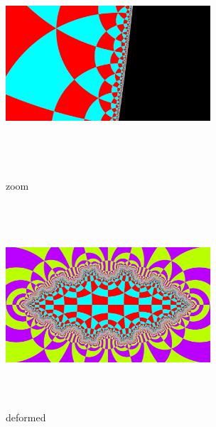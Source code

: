 \begin{figure}[htbp]
  \begin{minipage}{0.49\hsize}
   \center
   \includegraphics[width=3in, height=3in, keepaspectratio]{../img/tessellation/zoom.pdf}
   \caption{zoom}
   \label{fig:zoom}
  \end{minipage}
 \hspace*{\fill}
 \begin{minipage}{0.49\hsize}
  \center
  \includegraphics[width=3in, height=3in, keepaspectratio]{../img/tessellation/deformed.pdf}
  \caption{deformed}
  \label{fig:deformed}
 \end{minipage}
\end{figure}

\clearpage